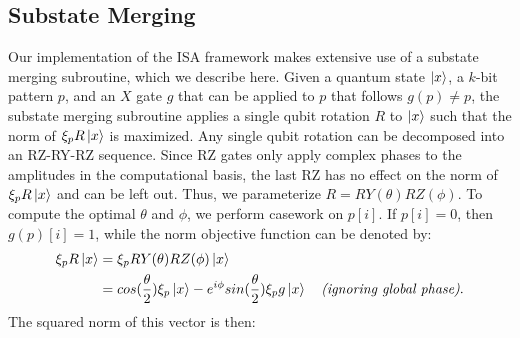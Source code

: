 \subsection{Substate Merging}\label{substate_merge}
Our implementation of the ISA framework makes extensive use of a substate merging
subroutine, which we describe here. Given a quantum state $\mathinner{|{x}\rangle}$, a $k$-bit
pattern $p$, and an $X$ gate $g$ that can be applied to $p$ that follows $g(p) \neq p$, the 
substate merging subroutine applies a single qubit rotation $R$ to $\mathinner{|{x}\rangle}$ such
that the norm of $\xi_pR\mathinner{|{x}\rangle}$ is maximized. Any single qubit rotation can be decomposed into an RZ-RY-RZ sequence. Since RZ
gates only apply complex phases to the amplitudes in the computational basis, the
last RZ has no effect on the norm of $\xi_pR\mathinner{|{x}\rangle}$ and can be left out. Thus, we
parameterize $R = RY(\theta)RZ(\phi)$. To compute the optimal $\theta$ and $\phi$, we perform casework on $p[i]$. If
$p[i] = 0$, then $g(p)[i] = 1$, while the norm objective function can be denoted by:
\begin{align}
\label{eq7}
\xi_pR\mathinner{|{x}\rangle} &= \xi_pRY(\theta)RZ(\phi)\mathinner{|{x}\rangle} \nonumber \\
 &= cos(\frac{\theta}{2})\xi_p\mathinner{|{x}\rangle} - e^{i\phi}sin(\frac{\theta}{2})\xi_pg\mathinner{|{x}\rangle} \quad \textit{(ignoring global phase)}.
\end{align}
The squared norm of this vector is then:


  

